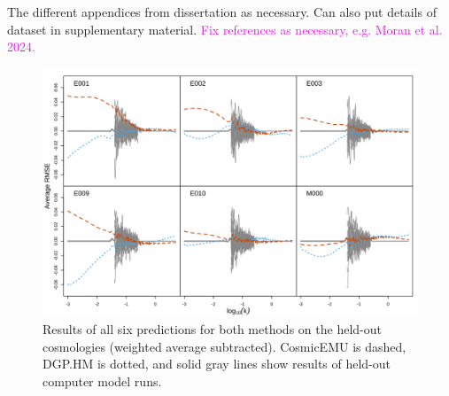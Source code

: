 \documentclass[11pt]{article}
\begin{document}
The different appendices from dissertation as necessary. Can also put details of dataset in supplementary material. \textcolor{magenta}{Fix references as necessary, e.g. Moran et al. 2024.}

\begin{figure}[ht]
    \centering
    \includegraphics[width=6in]{pred_1to6.png}
    \caption{Results of all six predictions for both methods on the held-out cosmologies (weighted average subtracted). CosmicEMU is dashed, DGP.HM is dotted, and solid gray lines show results of held-out computer model runs.}
    \label{fig:plot_pred_1to6}
\end{figure}



\end{document}
